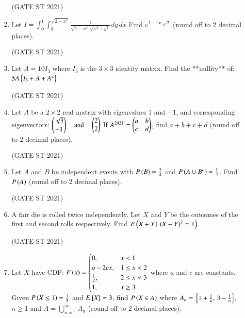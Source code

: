 \documentclass[journal,12pt,onecolumn]{IEEEtran}
\theoremstyle{remark}
\begin{document}
\begin{enumerate}
\hfill (GATE ST 2021) \\
\item
Let
$
I = \int_{0}^{1} \int_{0}^{\sqrt{2 - x^2}} \frac{1}{\sqrt{1 - x^2} \, \sqrt{x^2 + y^2}} \, dy \, dx
$
Find $e^{I + \ln{\sqrt{2}}}$ (round off to 2 decimal places).

\hfill (GATE ST 2021) \\

\item
Let $A = 10I_3$ where $I_3$ is the $3 \times 3$ identity matrix.  
Find the **nullity** of:
$
5A \left(I_3 + A + A^2\right)
$

\hfill (GATE ST 2021) \\

\item
Let $A$ be a $2 \times 2$ real matrix with eigenvalues $1$ and $-1$, and corresponding eigenvectors:
$
\begin{pmatrix} \sqrt{3} \\ -1 \end{pmatrix}
\quad \text{and} \quad
\begin{pmatrix} 2 \\ 2 \end{pmatrix}
$
If $A^{2021} = \begin{pmatrix} a & b \\ c & d \end{pmatrix}$,  
find $a+b+c+d$ (round off to 2 decimal places).

\hfill (GATE ST 2021) \\

\item
Let $A$ and $B$ be independent events with $P\left(B\right) = \frac{3}{4}$ and $P\left(A \cup B^c\right) = \frac12$.  
Find $P\left(A\right)$ (round off to 2 decimal places).

\hfill (GATE ST 2021) \\

\item
A fair die is rolled twice independently.  
Let $X$ and $Y$ be the outcomes of the first and second rolls respectively.  
Find $E\left(X + Y \, | \, \left(X - Y\right)^2 = 1\right)$.

\hfill (GATE ST 2021) \\

\item
Let $X$ have CDF:
$
F\brak{x} =
\begin{cases}
    
0, & x < 1 \\
a - 2c x, & 1 \le x < 2 \\
\frac12, & 2 \le x < 3 \\
1, & x \ge 3
\end{cases}
$
where $a$ and $c$ are constants.  
Given $P\brak{X \leq 1} = \frac15$ and $E\sbrak{X} = 3$,  
find $P\brak{X \in A}$ where $A_n = \sbrak{1+\frac1n,\, 3 - \frac1n}$, $n \ge 1$ and $A = \bigcup_{n=1}^\infty A_n$ (round off to 2 decimal places).


\end{enumerate}
\end{document}
